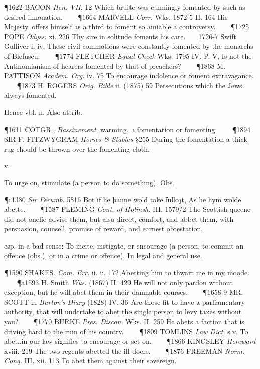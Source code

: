 \begin{description}[wide, labelwidth=!, labelindent=0pt]
\begin{myenumerate}
\P 1622 BACON  \textit{Hen. VII}, 12 Which bruite was cunningly fomented by such as desired innouation.    
\P 1664 MARVELL  \textit{Corr.} Wks. 1872-5 II. 164 His Majesty..offers himself as a third to foment so amiable a controversy.    
\P 1725 POPE  \textit{Odyss.} xi. 226 Thy sire in solitude foments his care.    1726-7 Swift Gulliver i. iv, These civil commotions were constantly fomented by the monarchs of Blefuscu.    
\P 1774 FLETCHER  \textit{Equal Check} Wks. 1795 IV. P. V,  Is not the Antinomianism of hearers fomented by that of preachers?    
\P 1868 M. PATTISON  \textit{Academ. Org.} iv. 75 To encourage indolence or foment extravagance.    
\P 1873 H. ROGERS  \textit{Orig. Bible} ii. (1875) 59 Persecutions which the Jews always fomented.

Hence  vbl. n. Also attrib.

\P 1611 COTGR.,  \textit{Bassinement}, warming, a fomentation or fomenting.    
\P 1894 SIR F. FITZWYGRAM  \textit{Horses \& Stables} §255 During the fomentation a thick rug should be thrown over the fomenting cloth.
\end{myenumerate}


 v.

\noindent {}

\vspace{-0.3cm}

\begin{myenumerate}

 To urge on, stimulate (a person to do something). Obs.

\P c1380 \textit{Sir Ferumb.} 5816 Bot if he þanne wold take fulloȝt, As he hym wolde abette.    
\P 1587 FLEMING  \textit{Cont. of Holinsh.} III. 1579/2 The Scottish queene did not onelie advise them, but also direct, comfort, and abbet them, with persuasion, counsell, promise of reward, and earnest obtestation.

 esp. in a bad sense: To incite, instigate, or encourage (a person, to commit an offence (obs.), or in a crime or offence). In legal and general use.

\P 1590 SHAKES.  \textit{Com. Err.} ii. ii. 172 Abetting him to thwart me in my moode.    
\P a1593 H. Smith \textit{Wks.} (1867) II. 429 He will not only pardon without exception, but he will abet them in their damnable courses.    
\P 1658-9 MR. SCOTT in \textit{Burton's Diary} (1828) IV. 36 Are those fit to have a parliamentary authority, that will undertake to abet the single person to levy taxes without you?    
\P 1770 BURKE  \textit{Pres. Discon.} Wks. II. 259 He abets a faction that is driving hard to the ruin of his country.    
\P 1809 TOMLINS  \textit{Law Dict.} s.v. To abet..in our law signifies to encourage or set on.    
\P 1866 KINGSLEY  \textit{Hereward} xviii. 219 The two regents abetted the ill-doers.    
\P 1876 FREEMAN  \textit{Norm. Conq.} III. xii. 113 To abet them against their sovereign.


\end{myenumerate}
\end{description}
